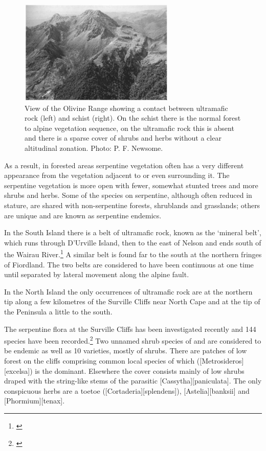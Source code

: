 \begin{figure}
	\includegraphics[width=0.66\textwidth]{graphics/figure89olivine-range.jpg}
	\centering
	\caption[View of the Olivine Range]{View of the Olivine Range showing a contact between ultramafic rock (left) and schist (right).
	On the schist there is the normal forest to alpine vegetation sequence, on the ultramafic rock this is absent and there is a sparse cover of shrubs and herbs without a clear altitudinal zonation.
	Photo: P. F. Newsome.}%
	\label{fig:89olivine-range}
\end{figure}

As a result, in forested areas serpentine vegetation often has a very different appearance from the vegetation adjacent to or even surrounding it.
The serpentine vegetation is more open with fewer, somewhat stunted trees and more shrubs and herbs.
Some of the species on serpentine, although often reduced in stature, are shared with non-serpentine forests, shrublands and grasslands; others are unique and are known as serpentine endemics.

In the South Island there is a belt of ultramafic rock, known as the `mineral belt', which runs through D'Urville Island, then to the east of Nelson and ends south of the Wairau River.\footnote{\cite{betts1918notes}}
A similar belt is found far to the south at the northern fringes of Fiordland.
The two belts are considered to have been continuous at one time until separated by lateral movement along the alpine fault.

In the North Island the only occurrences of ultramafic rock are at the northern tip along a few kilometres of the Surville Cliffs near North Cape and at the tip of the Peninsula a little to the south.

The serpentine flora at the Surville Cliffs has been investigated recently and 144 species have been recorded.\footnote{\cite{druce1979indigenous}}
Two unnamed shrub species of  and  are considered to be endemic as well as 10 varieties, mostly of shrubs.
There are patches of low forest on the cliffs comprising common local species of which  ([Metrosideros][excelsa]) is the dominant.
Elsewhere the cover consists mainly of low shrubs draped with the string-like stems of the parasitic [Cassytha][paniculata].
The only conspicuous herbs are a toetoe ([Cortaderia][splendens]), [Astelia][banksii] and [Phormium][tenax].

